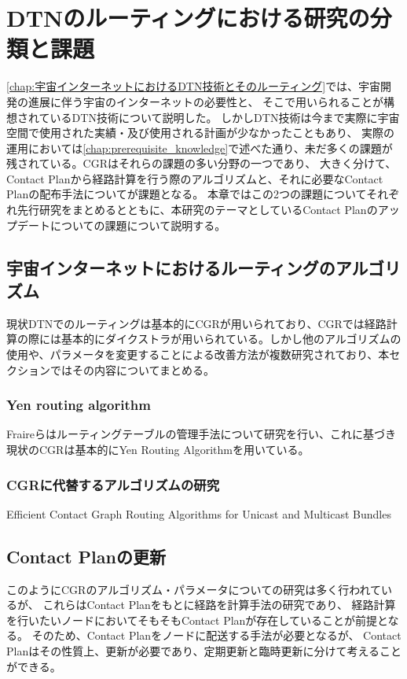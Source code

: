 \chapter{DTNのルーティングにおける研究の分類と課題}

\label{chap:related_works}
\ref{chap:宇宙インターネットにおけるDTN技術とそのルーティング}では、宇宙開発の進展に伴う宇宙のインターネットの必要性と、
そこで用いられることが構想されているDTN技術について説明した。
しかしDTN技術は今まで実際に宇宙空間で使用された実績・及び使用される計画が少なかったこともあり、
実際の運用においては\ref{chap:prerequisite_knowledge}で述べた通り、未だ多くの課題が残されている。CGRはそれらの課題の多い分野の一つであり、
大きく分けて、Contact Planから経路計算を行う際のアルゴリズムと、それに必要なContact Planの配布手法についてが課題となる。
本章ではこの2つの課題についてそれぞれ先行研究をまとめるとともに、本研究のテーマとしているContact Planのアップデートについての課題について説明する。

\section{宇宙インターネットにおけるルーティングのアルゴリズム}
\label{sec:宇宙インターネットにおけるルーティングのアルゴリズム}    
現状DTNでのルーティングは基本的にCGRが用いられており、CGRでは経路計算の際には基本的にダイクストラが用いられている。しかし他のアルゴリズムの使用や、パラメータを変更することによる改善方法が複数研究されており、本セクションではその内容についてまとめる。
\subsection{Yen routing algorithm}
\label{sec:Yen routing algorithm}
Fraireらはルーティングテーブルの管理手法について研究を行い、これに基づき現状のCGRは基本的にYen Routing Algorithmを用いている。\cite{FRAIRE2018}

\subsection{CGRに代替するアルゴリズムの研究}
\label{sec:CGRに代替するアルゴリズムの研究}
Efficient Contact Graph Routing Algorithms for Unicast and Multicast Bundles
\cite{DeJonckere2019}


\section{Contact Planの更新}
\label{sec:ContactPlanの更新}
このようにCGRのアルゴリズム・パラメータについての研究は多く行われているが、
これらはContact Planをもとに経路を計算手法の研究であり、
経路計算を行いたいノードにおいてそもそもContact Planが存在していることが前提となる。
そのため、Contact Planをノードに配送する手法が必要となるが、
Contact Planはその性質上、更新が必要であり、定期更新と臨時更新に分けて考えることができる。

